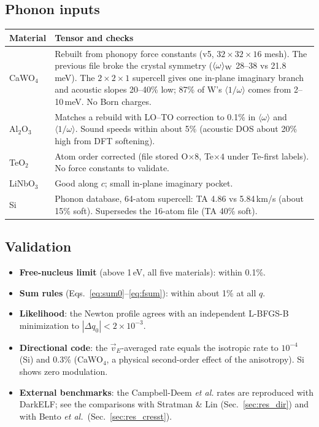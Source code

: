 \documentclass[11pt,a4paper]{article}
\numberwithin{equation}{section}
\newcommand{\avg}[1]{\langle #1\rangle}
\begin{document}
\subsection{Phonon inputs}
\begin{center}\small
\begin{tabularx}{\textwidth}{lX}
\toprule
Material & Tensor and checks\\
\midrule
CaWO$_4$ & Rebuilt from phonopy force constants (v5, $32\times32\times16$ mesh). The previous file broke the crystal symmetry ($\avg\omega_{\rm W}$ 28--38 vs 21.8\,meV). The $2\times2\times1$ supercell gives one in-plane imaginary branch and acoustic slopes 20--40\% low; 87\% of W's $\avg{1/\omega}$ comes from 2--10\,meV. No Born charges.\\
Al$_2$O$_3$ & Matches a rebuild with LO--TO correction to 0.1\% in $\avg\omega$ and $\avg{1/\omega}$. Sound speeds within about 5\% (acoustic DOS about 20\% high from DFT softening).\\
TeO$_2$ & Atom order corrected (file stored O$\times8$, Te$\times4$ under Te-first labels). No force constants to validate.\\
LiNbO$_3$ & Good along $c$; small in-plane imaginary pocket.\\
Si & Phonon database, 64-atom supercell: TA 4.86 vs 5.84\,km/s (about 15\% soft). Supersedes the 16-atom file (TA 40\% soft).\\
\bottomrule
\end{tabularx}
\end{center}

\subsection{Validation}
\begin{itemize}
  \item \textbf{Free-nucleus limit} (above 1\,eV, all five materials): within 0.1\%.
  \item \textbf{Sum rules} (Eqs.~\ref{eq:sum0}--\ref{eq:fsum}): within about 1\% at all $q$.
  \item \textbf{Likelihood}: the Newton profile agrees with an independent L-BFGS-B
  minimization to $|\Delta q_0|<2\times10^{-3}$.
  \item \textbf{Directional code}: the $\vec v_E$-averaged rate equals the isotropic rate to
  $10^{-4}$ (Si) and 0.3\% (CaWO$_4$, a physical second-order effect of the anisotropy). Si
  shows zero modulation.
  \item \textbf{External benchmarks}: the Campbell-Deem \emph{et al.} rates are reproduced with
  DarkELF; see the comparisons with Stratman \& Lin (Sec.~\ref{sec:res_dir}) and with Bento
  \emph{et al.}\ (Sec.~\ref{sec:res_cresst}).
\end{itemize}
\end{document}
